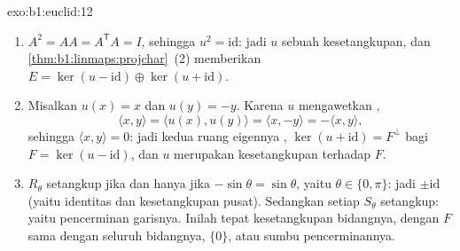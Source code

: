 \begin{solution}{exo:b1:euclid:12}
\begin{enumerate}
  \item $A^2 = A A = A^{\mathsf T} A = I$, sehingga $u^2 =
        \mathrm{id}$: jadi $u$ sebuah kesetangkupan, dan
        \cref{thm:b1:linmaps:projchar}~(2) memberikan $E = \ker(u -
        \mathrm{id}) \oplus \ker(u + \mathrm{id})$.
  \item Misalkan $u(x) = x$ dan $u(y) = -y$. Karena $u$ mengawetkan
        ,
        \[
        \langle x, y\rangle = \langle u(x), u(y)\rangle
        = \langle x, -y\rangle = -\langle x, y\rangle ,
        \]
        sehingga $\langle x, y\rangle = 0$: jadi kedua ruang eigennya
        , $\ker(u + \mathrm{id}) = F^\perp$ bagi $F =
        \ker(u - \mathrm{id})$, dan $u$ merupakan kesetangkupan
         terhadap $F$.
  \item $R_\theta$ setangkup jika dan hanya jika $-\sin\theta = \sin\theta$,
        yaitu $\theta \in \{0, \pi\}$: jadi  $\pm\mathrm{id}$
        (yaitu identitas dan kesetangkupan pusat). Sedangkan setiap $S_\theta$
        setangkup: yaitu pencerminan garisnya. Inilah tepat
        kesetangkupan  bidangnya, dengan $F$ sama dengan
        seluruh bidangnya, $\{0\}$, atau sumbu pencerminannya.
\end{enumerate}
\end{solution}

